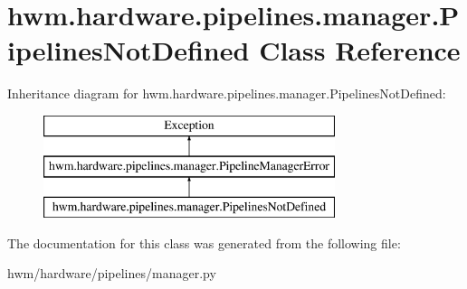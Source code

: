 \hypertarget{classhwm_1_1hardware_1_1pipelines_1_1manager_1_1_pipelines_not_defined}{\section{hwm.\-hardware.\-pipelines.\-manager.\-Pipelines\-Not\-Defined Class Reference}
\label{classhwm_1_1hardware_1_1pipelines_1_1manager_1_1_pipelines_not_defined}
}
Inheritance diagram for hwm.\-hardware.\-pipelines.\-manager.\-Pipelines\-Not\-Defined\-:\begin{figure}[H]
\begin{center}
\leavevmode
\includegraphics[height=3.000000cm]{classhwm_1_1hardware_1_1pipelines_1_1manager_1_1_pipelines_not_defined}
\end{center}
\end{figure}


The documentation for this class was generated from the following file\-:\begin{DoxyCompactItemize}
\item 
hwm/hardware/pipelines/manager.\-py\end{DoxyCompactItemize}
